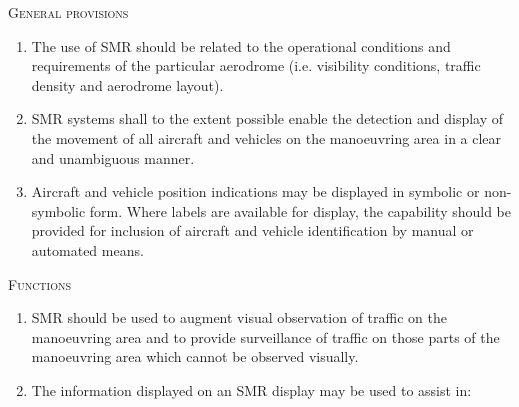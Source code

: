 \begin{enumeratesc}
    \item \textsc{General provisions}
    \begin{enumerate}
        \item The use of SMR should be related to the operational conditions and requirements of the particular aerodrome (i.e. visibility conditions, traffic density and aerodrome layout).
        \item SMR systems shall to the extent possible enable the detection and display of the movement of all aircraft and vehicles on the manoeuvring area in a clear and unambiguous manner.
        \item Aircraft and vehicle position indications may be displayed in symbolic or non-symbolic form. Where labels are available for display, the capability should be provided for inclusion of aircraft and vehicle identification by manual or automated means.
    \end{enumerate}

    \item \textsc{Functions}
    \begin{enumerate}
        \item SMR should be used to augment visual observation of traffic on the manoeuvring area and to provide surveillance of traffic on those parts of the manoeuvring area which cannot be observed visually.
        \item The information displayed on an SMR display may be used to assist in:
        
    \end{enumerate}


\end{enumeratesc}

